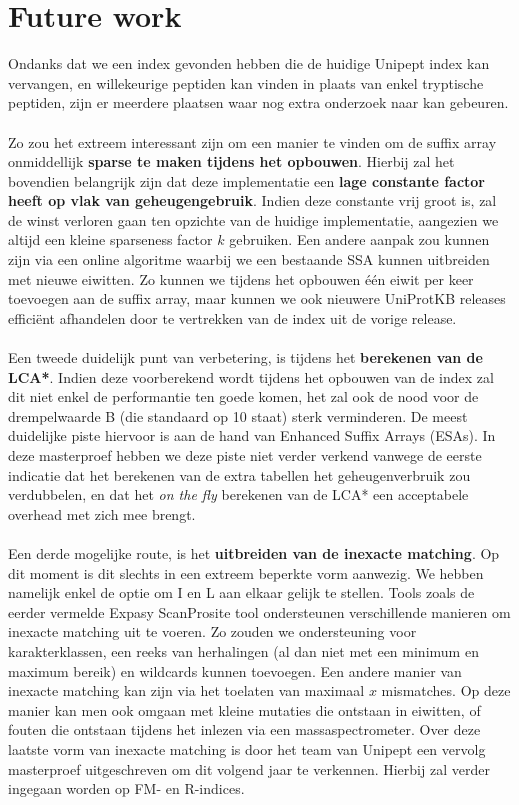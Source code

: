 \section{Future work}
Ondanks dat we een index gevonden hebben die de huidige Unipept index kan vervangen, en willekeurige peptiden kan vinden in plaats van enkel tryptische peptiden, zijn er meerdere plaatsen waar nog extra onderzoek naar kan gebeuren.
\\ \\
Zo zou het extreem interessant zijn om een manier te vinden om de suffix array onmiddellijk \textbf{sparse te maken tijdens het opbouwen}.
Hierbij zal het bovendien belangrijk zijn dat deze implementatie een \textbf{lage constante factor heeft op vlak van geheugengebruik}.
Indien deze constante vrij groot is, zal de winst verloren gaan ten opzichte van de huidige implementatie, aangezien we altijd een kleine sparseness factor $k$ gebruiken.
Een andere aanpak zou kunnen zijn via een online algoritme waarbij we een bestaande SSA kunnen uitbreiden met nieuwe eiwitten.
Zo kunnen we tijdens het opbouwen één eiwit per keer toevoegen aan de suffix array, maar kunnen we ook nieuwere UniProtKB releases efficiënt afhandelen door te vertrekken van de index uit de vorige release.
\\ \\
Een tweede duidelijk punt van verbetering, is tijdens het \textbf{berekenen van de LCA*}.
Indien deze voorberekend wordt tijdens het opbouwen van de index zal dit niet enkel de performantie ten goede komen, het zal ook de nood voor de drempelwaarde B (die standaard op 10 staat) sterk verminderen.
De meest duidelijke piste hiervoor is aan de hand van Enhanced Suffix Arrays (ESAs).
In deze masterproef hebben we deze piste niet verder verkend vanwege de eerste indicatie dat het berekenen van de extra tabellen het geheugenverbruik zou verdubbelen, en dat het \textit{on the fly} berekenen van de LCA* een acceptabele overhead met zich mee brengt.
\\ \\
Een derde mogelijke route, is het \textbf{uitbreiden van de inexacte matching}.
Op dit moment is dit slechts in een extreem beperkte vorm aanwezig.
We hebben namelijk enkel de optie om I en L aan elkaar gelijk te stellen.
Tools zoals de eerder vermelde Expasy ScanProsite tool ondersteunen verschillende manieren om inexacte matching uit te voeren.
Zo zouden we ondersteuning voor karakterklassen, een reeks van herhalingen (al dan niet met een minimum en maximum bereik) en wildcards kunnen toevoegen.
Een andere manier van inexacte matching kan zijn via het toelaten van maximaal $x$ mismatches.
Op deze manier kan men ook omgaan met kleine mutaties die ontstaan in eiwitten, of fouten die ontstaan tijdens het inlezen via een massaspectrometer.
Over deze laatste vorm van inexacte matching is door het team van Unipept een vervolg masterproef uitgeschreven om dit volgend jaar te verkennen.
Hierbij zal verder ingegaan worden op FM- en R-indices.